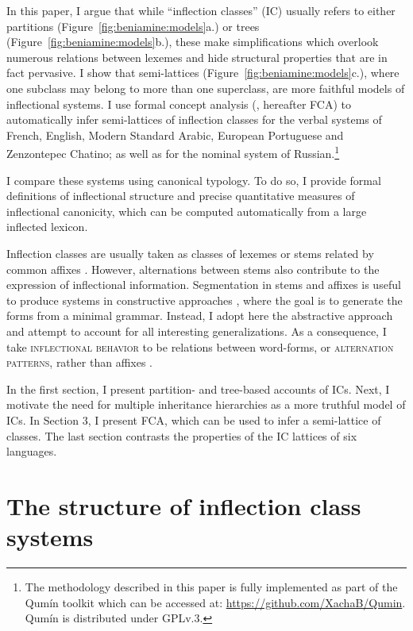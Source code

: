 \documentclass[output=paper]{langscibook}
\begin{document}
    In this paper, I argue that while ``inflection classes'' (IC) usually refers to either partitions (Figure~\ref{fig:beniamine:models}a.) or trees (Figure~\ref{fig:beniamine:models}b.), these make simplifications which overlook numerous relations between lexemes and hide structural properties that are in fact pervasive. I show that semi-lattices (Figure~\ref{fig:beniamine:models}c.), where one subclass may belong to more than one superclass, are more faithful models of inflectional systems. I use formal concept analysis (\citealt{GanterWille1998}, hereafter FCA) to automatically infer semi-lattices of inflection classes for the verbal systems of French, English, Modern Standard Arabic, European Portuguese and Zenzontepec Chatino; as well as for the nominal system of Russian.\footnote{The methodology described in this paper is fully implemented as part of the Qumín toolkit \citep{BeniaminePhd} which can be accessed at: \url{https://github.com/XachaB/Qumin}. Qumín is distributed under GPLv.3.}

    I compare these systems using canonical typology. To do so, I provide formal definitions of inflectional structure and precise quantitative measures of inflectional canonicity, which can be computed automatically from a large inflected lexicon.

	Inflection classes are usually taken as classes of lexemes or stems related by common affixes \citep{Carstairs1987,Carstairs-McCarthy1991,StumpFinkel2013}. However, alternations between stems also contribute to the expression of inflectional information. Segmentation in stems and affixes is useful to produce systems in constructive approaches \citep[in the sense of][]{Blevins2006}, where the goal is to generate the forms from a minimal grammar. Instead, I adopt here the abstractive approach \citep{Blevins2006} and attempt to account for all interesting generalizations. As a consequence, I take \textsc{inflectional behavior} to be relations between word-forms, or \textsc{alternation patterns}, rather than affixes \citep{BonamiLuis2014, BonamiBeniamine2016}.

    In the first section, I present partition- and tree-based accounts of ICs. Next, I motivate the need for multiple inheritance hierarchies as a more truthful model of ICs. In Section 3, I present FCA, which can be used to infer a semi-lattice of classes. The last section contrasts the properties of the IC lattices of six languages.

\section{The structure of inflection class systems}
    \label{Section:beniamine:structure-of-IC-systems}
\end{document}
